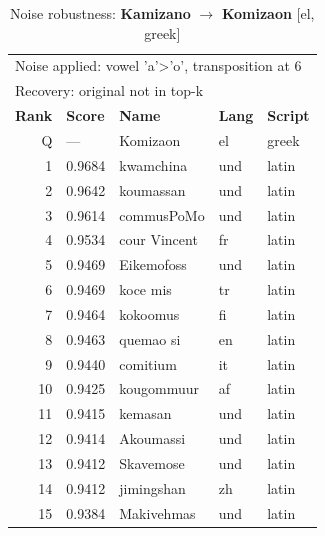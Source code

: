 \begin{table}[htbp]
\centering
\small
\caption{Noise robustness: \textbf{Kamizano} $\rightarrow$ \textbf{Komizaon} [el, greek]}
\label{tab:noise-28}
\begin{tabular}{rllll}
\toprule
\multicolumn{5}{l}{\small Noise applied: vowel 'a'>'o', transposition at 6} \\
\multicolumn{5}{l}{\small Recovery: original not in top-k} \\
\midrule
\textbf{Rank} & \textbf{Score} & \textbf{Name} & \textbf{Lang} & \textbf{Script} \\
\midrule
\rowcolor{gray!20} Q & --- & Komizaon & el & greek \\
\midrule
1 & 0.9684 & kwamchina & und & latin \\
2 & 0.9642 & koumassan & und & latin \\
3 & 0.9614 & commusPoMo & und & latin \\
4 & 0.9534 & cour Vincent & fr & latin \\
5 & 0.9469 & Eikemofoss & und & latin \\
6 & 0.9469 & koce mis & tr & latin \\
7 & 0.9464 & kokoomus & fi & latin \\
8 & 0.9463 & quemao si & en & latin \\
9 & 0.9440 & comitium & it & latin \\
10 & 0.9425 & kougommuur & af & latin \\
11 & 0.9415 & kemasan & und & latin \\
12 & 0.9414 & Akoumassi & und & latin \\
13 & 0.9412 & Skavemose & und & latin \\
14 & 0.9412 & jimingshan & zh & latin \\
15 & 0.9384 & Makivehmas & und & latin \\
\bottomrule
\end{tabular}
\end{table}

